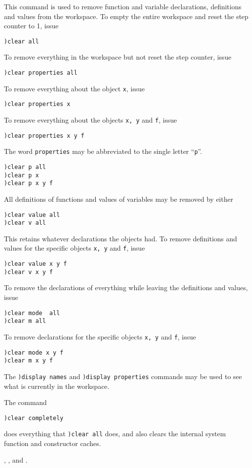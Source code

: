 This command is used to remove function and variable declarations, definitions
and values  from the workspace.
To  empty the entire workspace  and reset the
step counter to 1, issue
\begin{verbatim}
)clear all
\end{verbatim}
To remove everything in the workspace but not reset the step counter, issue
\begin{verbatim}
)clear properties all
\end{verbatim}
To remove everything about the object {\tt x}, issue
\begin{verbatim}
)clear properties x
\end{verbatim}
To remove everything about the objects {\tt x, y} and {\tt f}, issue
\begin{verbatim}
)clear properties x y f
\end{verbatim}

The word {\tt properties} may be abbreviated to the single letter
``{\tt p}''.
\begin{verbatim}
)clear p all
)clear p x
)clear p x y f
\end{verbatim}
All definitions of functions and values of variables may be removed by either
\begin{verbatim}
)clear value all
)clear v all
\end{verbatim}
This retains whatever declarations the objects had.  To remove definitions and
values for the specific objects {\tt x, y} and {\tt f}, issue
\begin{verbatim}
)clear value x y f
)clear v x y f
\end{verbatim}
To remove  the declarations  of everything while  leaving the  definitions and
values, issue
\begin{verbatim}
)clear mode  all
)clear m all
\end{verbatim}
To remove declarations for the specific objects {\tt x, y} and {\tt f}, issue
\begin{verbatim}
)clear mode x y f
)clear m x y f
\end{verbatim}
The {\tt )display names} and {\tt )display properties} commands  may be used
to see what is currently in the workspace.

The command
\begin{verbatim}
)clear completely
\end{verbatim}
does everything that {\tt )clear all} does, and also clears the internal
system function and constructor caches.

\par{}
,
, and
.


